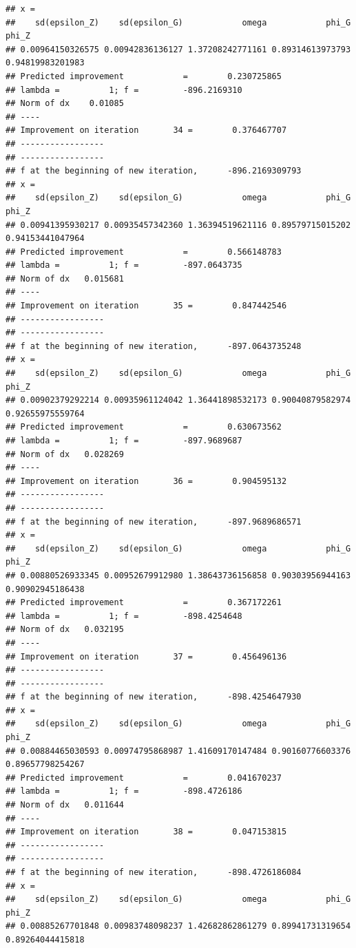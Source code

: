 \documentclass[12pt,a4paper,]{article}
\newcommand{\0}{\mathbf{0}}
\begin{document}
\begin{verbatim}
## x =
##    sd(epsilon_Z)    sd(epsilon_G)            omega            phi_G            phi_Z 
## 0.00964150326575 0.00942836136127 1.37208242771161 0.89314613973793 0.94819983201983 
## Predicted improvement            =        0.230725865
## lambda =          1; f =         -896.2169310 
## Norm of dx    0.01085
## ----
## Improvement on iteration       34 =        0.376467707
## -----------------
## -----------------
## f at the beginning of new iteration,      -896.2169309793 
## x =
##    sd(epsilon_Z)    sd(epsilon_G)            omega            phi_G            phi_Z 
## 0.00941395930217 0.00935457342360 1.36394519621116 0.89579715015202 0.94153441047964 
## Predicted improvement            =        0.566148783
## lambda =          1; f =         -897.0643735 
## Norm of dx   0.015681
## ----
## Improvement on iteration       35 =        0.847442546
## -----------------
## -----------------
## f at the beginning of new iteration,      -897.0643735248 
## x =
##    sd(epsilon_Z)    sd(epsilon_G)            omega            phi_G            phi_Z 
## 0.00902379292214 0.00935961124042 1.36441898532173 0.90040879582974 0.92655975559764 
## Predicted improvement            =        0.630673562
## lambda =          1; f =         -897.9689687 
## Norm of dx   0.028269
## ----
## Improvement on iteration       36 =        0.904595132
## -----------------
## -----------------
## f at the beginning of new iteration,      -897.9689686571 
## x =
##    sd(epsilon_Z)    sd(epsilon_G)            omega            phi_G            phi_Z 
## 0.00880526933345 0.00952679912980 1.38643736156858 0.90303956944163 0.90902945186438 
## Predicted improvement            =        0.367172261
## lambda =          1; f =         -898.4254648 
## Norm of dx   0.032195
## ----
## Improvement on iteration       37 =        0.456496136
## -----------------
## -----------------
## f at the beginning of new iteration,      -898.4254647930 
## x =
##    sd(epsilon_Z)    sd(epsilon_G)            omega            phi_G            phi_Z 
## 0.00884465030593 0.00974795868987 1.41609170147484 0.90160776603376 0.89657798254267 
## Predicted improvement            =        0.041670237
## lambda =          1; f =         -898.4726186 
## Norm of dx   0.011644
## ----
## Improvement on iteration       38 =        0.047153815
## -----------------
## -----------------
## f at the beginning of new iteration,      -898.4726186084 
## x =
##    sd(epsilon_Z)    sd(epsilon_G)            omega            phi_G            phi_Z 
## 0.00885267701848 0.00983748098237 1.42682862861279 0.89941731319654 0.89264044415818 

\end{verbatim}
\end{document}
